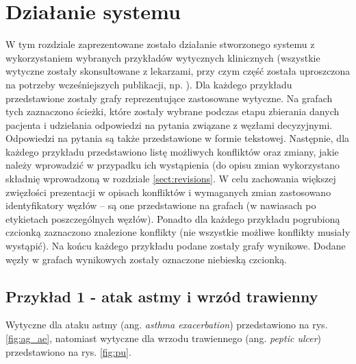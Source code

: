 \chapter{Działanie systemu}
W tym rozdziale zaprezentowane zostało działanie stworzonego systemu z wykorzystaniem wybranych przykładów wytycznych klinicznych (wszystkie wytyczne zostały skonsultowane z lekarzami, przy czym część została uproszczona na potrzeby wcześniejszych publikacji, np. \citep{SzWilk,SzWilk2}). Dla każdego przykładu przedstawione zostały grafy reprezentujące zastosowane wytyczne. Na grafach tych zaznaczono ścieżki, które zostały wybrane podczas etapu zbierania danych pacjenta i udzielania odpowiedzi na pytania związane z węzłami decyzyjnymi. Odpowiedzi na pytania są także przedstawione w formie tekstowej. Następnie, dla każdego przykładu przedstawiono listę możliwych konfliktów oraz zmiany, jakie należy wprowadzić w przypadku ich wystąpienia (do opisu zmian wykorzystano składnię wprowadzoną w rozdziale \ref{sect:revisions}. W celu zachowania większej zwięzłości prezentacji w opisach konfliktów i wymaganych zmian zastosowano identyfikatory węzłów -- są one przedstawione na grafach (w nawiasach po etykietach poszczególnych węzłów). Ponadto dla każdego przykładu pogrubioną czcionką zaznaczono znalezione konflikty (nie wszystkie możliwe konflikty musiały wystąpić). Na końcu każdego przykładu podane zostały grafy wynikowe. Dodane węzły w grafach wynikowych zostały oznaczone niebieską czcionką.

\section{Przykład 1 - atak astmy i wrzód trawienny}
Wytyczne dla ataku astmy (ang. \textit{asthma exacerbation}) przedstawiono na rys. \ref{fig:ag_ae}, natomiast wytyczne dla wrzodu trawiennego (ang. \textit{peptic ulcer}) przedstawiono na rys. \ref{fig:pu}.

